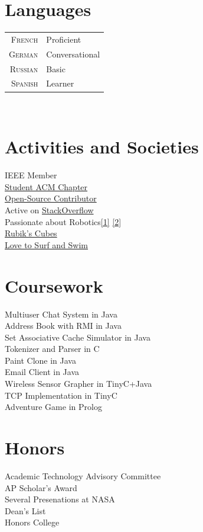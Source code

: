 \documentclass[10pt]{article}
\begin{document}
\begin{minipage}[t]{0.44\textwidth}
\section{Languages}
\begin{tabular}{rl}
   \textsc{French}   &  Proficient\\
   \textsc{German}   &  Conversational\\
   \textsc{Russian}  &  Basic\\
   \textsc{Spanish}  &  Learner\\
\end{tabular}\\[5pt]

\section{Activities and Societies}
   IEEE Member\\
   \href{http://polaris.cs.wcu.edu/~acm/}{Student ACM Chapter}\\
   \href{https://github.com/ranman}{Open-Source Contributor}\\
   Active on \href{http://stackoverflow.com/users/240004/ranman}
   {StackOverflow}\\
   Passionate about Robotics\href{http://robotics.punahou.edu/}{[1]}
   \href{http://irg.arc.nasa.gov}{[2]}\\
   \href{http://www.youtube.com/user/ranman96734}{Rubik's Cubes}\\
   \href{http://www.punahouaquatics.org/Home.jsp?team=hipaq}
   {Love to Surf and Swim}\\
\section{Coursework}
   Multiuser Chat System in Java\\
   Address Book with RMI in Java\\
   Set Associative Cache Simulator in Java\\
   Tokenizer and Parser in C\\
   Paint Clone in Java\\
   Email Client in Java\\
   Wireless Sensor Grapher in TinyC+Java\\
   TCP Implementation in TinyC\\
   Adventure Game in Prolog\\
\section{Honors}
   Academic Technology Advisory Committee\\
   AP Scholar's Award\\
   Several Presenations at NASA\\
   Dean's List\\
   Honors College\\
\end{minipage}
\end{document}
